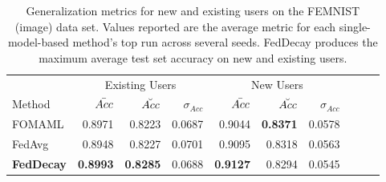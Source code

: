 \begin{table}[h]
    \centering
        \begin{tabular}{|l|rrr|rrr|rrr|}
        \hline
            & 
                \multicolumn{3}{c|}{Existing Users} & 
                \multicolumn{3}{c|}{New Users} \\ 
            Method & 
                $\Bar{Acc}$ & $\Breve{Acc}$ & $\sigma_{Acc}$ &
                $\Bar{Acc}$ & $\Breve{Acc}$ & $\sigma_{Acc}$ \\
        \hline
            FOMAML & 
                0.8971 & 0.8223 & 0.0687 & 
                0.9044 & \textbf{0.8371} & 0.0578 \\
            FedAvg & 
                0.8948 & 0.8227 & 0.0701 & 
                0.9095 & 0.8318 & 0.0563 \\
            \textbf{FedDecay} & 
                \textbf{0.8993} & \textbf{0.8285} & 0.0688 & 
                \textbf{0.9127} & 0.8294 & 0.0545 \\
        \hline
        \end{tabular}
    \caption{
        Generalization metrics for new and existing users on the FEMNIST (image) data set. Values reported are the average metric for each single-model-based method's top run across several seeds. FedDecay produces the maximum average test set accuracy on new and existing users.
    }
    \label{tab: metrics--seed--femnist}
\end{table}

